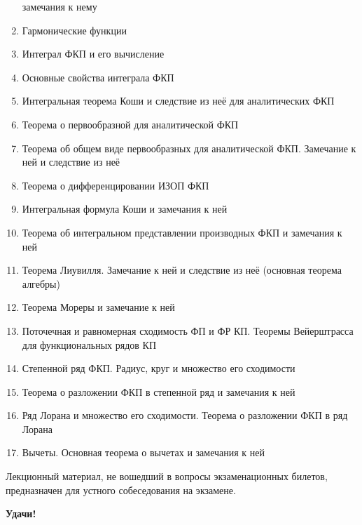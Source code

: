 \documentclass[../main.tex]{subfiles}
\begin{document}
\begin{enumerate}
    замечания к нему
    \item Гармонические функции
    \item Интеграл ФКП и его вычисление
    \item Основные свойства интеграла ФКП
    \item Интегральная теорема Коши и следствие из неё для аналитических ФКП
    \item Теорема о первообразной для аналитической ФКП
    \item Теорема об общем виде первообразных для аналитической ФКП. Замечание 
    к ней и следствие из неё
    \item Теорема о дифференцировании ИЗОП ФКП
    \item Интегральная формула Коши и замечания к ней
    \item Теорема об интегральном представлении производных ФКП и замечания к 
    ней
    \item Теорема Лиувилля. Замечание к ней и следствие из неё (основная 
    теорема алгебры)
    \item Теорема Мореры и замечание к ней
    \item Поточечная и равномерная сходимость ФП и ФР КП. Теоремы Вейерштрасса 
    для функциональных рядов КП
    \item Степенной ряд ФКП. Радиус, круг и множество его сходимости
    \item Теорема о разложении ФКП в степенной ряд и замечания к ней
    \item Ряд Лорана и множество его сходимости. Теорема о разложении ФКП в 
    ряд Лорана
    \item Вычеты. Основная теорема о вычетах и замечания к ней
 \end{enumerate}
 
\begin{rem}
Лекционный материал, не вошедший в вопросы экзаменационных билетов, 
предназначен для устного собеседования на экзамене.
\end{rem}

\medskip

\textbf{Удачи!}
\end{document}

